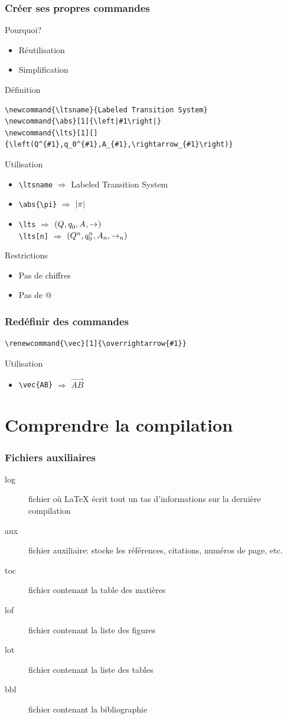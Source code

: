 \documentclass{beamer}
\newcommand{\ltsname}{Labeled Transition System}
\newcommand{\abs}[1]{\ensuremath\left|#1\right|}
\newcommand{\lts}[1][]{\ensuremath\left(Q^{#1}, q_0^{#1}, A_{#1}, \rightarrow_{#1}\right)}
\renewcommand{\vec}[1]{\overrightarrow{#1}}
\begin{document}
\begin{frame}[fragile]
	\frametitle{Créer ses propres commandes}
	Pourquoi?
	\begin{itemize}
		\item Réutilisation
		\item Simplification
	\end{itemize}
	
	Définition

	\begin{lstlisting}
\newcommand{\ltsname}{Labeled Transition System}
\newcommand{\abs}[1]{\left|#1\right|}
\newcommand{\lts}[1][]{\left(Q^{#1},q_0^{#1},A_{#1},\rightarrow_{#1}\right)}
	\end{lstlisting}
	Utilisation
		\begin{itemize}
	\item \lstinline?\ltsname? $\Rightarrow$ \ltsname
	\item \lstinline?\abs{\pi}? $\Rightarrow$ $\abs{\pi}$
	\item \lstinline?\lts? $\Rightarrow$ $\lts$\\
		\lstinline?\lts[n]? $\Rightarrow$ $\lts[n]$
	\end{itemize}
	Restrictions
	\begin{itemize}
		\item Pas de chiffres
		\item Pas de @
	\end{itemize}
\end{frame}

\begin{frame}[fragile]
	\frametitle{Redéfinir des commandes}

	\begin{lstlisting}
\renewcommand{\vec}[1]{\overrightarrow{#1}}
	\end{lstlisting}
	Utilisation
		\begin{itemize}
	\item \lstinline?\vec{AB}? $\Rightarrow$ $\vec{AB}$
	\end{itemize}

\end{frame}

\section{Comprendre la compilation}

\begin{frame}
	\frametitle{Fichiers auxiliaires}
	\begin{description}
	\item[log] fichier où \LaTeX{} écrit tout un tas d'informations sur la dernière compilation
	\item[aux] fichier auxiliaire: stocke les références, citations, numéros de page, etc.
	\item[toc] fichier contenant la table des matières
	\item[lof] fichier contenant la liste des figures
	\item[lot] fichier contenant la liste des tables
	\item[bbl] fichier contenant la bibliographie
	\end{description}
\end{frame}
\end{document}
